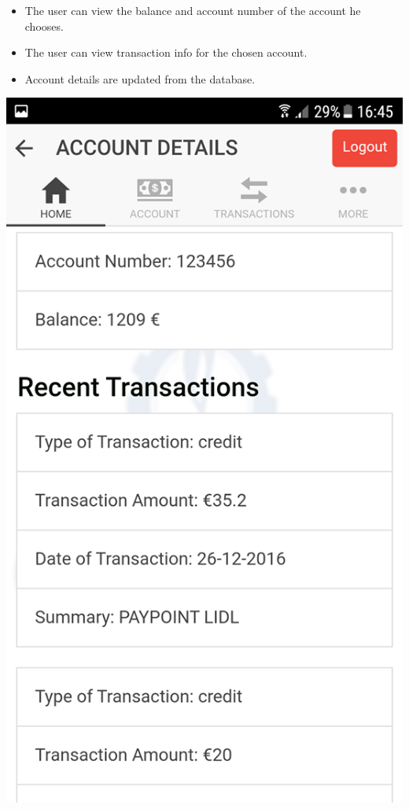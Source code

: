 \begin{itemize}
\begin{enumerate}
            \begin{itemize}
                \item The user can view the balance and account number of the account he chooses.
                \item The user can view transaction info for the chosen account.
                \item Account details are updated from the database.
            \end{itemize}
\begin{center}    
    \includegraphics[scale=0.5]{img/8homepagetransactions.png}

\end{center}
\end{enumerate}
\end{itemize}
